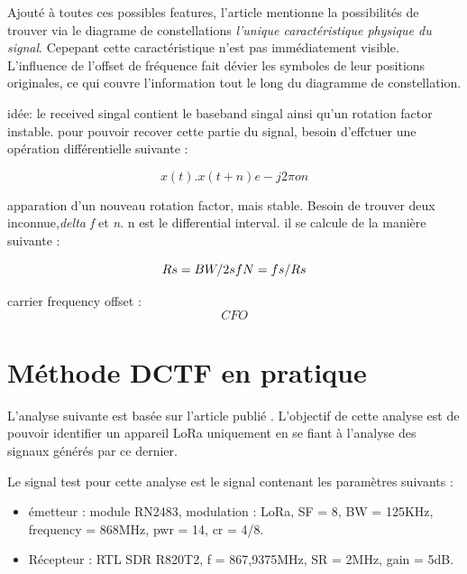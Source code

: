 Ajouté à toutes ces possibles features, l'article mentionne la possibilités de trouver via le diagrame de constellations \textit{l'unique caractéristique physique du signal}. Cepepant cette caractéristique n'est pas immédiatement visible. L'influence de l'offset de fréquence fait dévier les symboles de leur positions originales, ce qui couvre l'information tout le long du diagramme de constellation.


idée: le received singal contient le baseband singal ainsi qu'un rotation factor instable. pour pouvoir recover cette partie du signal, besoin d'effctuer une opération différentielle suivante :

\begin{equation}\label{eq1}
	x(t) . x(t+n) e -j2\pi on
\end{equation} 

apparation d'un nouveau rotation factor, mais stable. Besoin de trouver deux inconnue,\textit{delta f} et \textit{n}. n est le differential interval. il se calcule de la manière suivante :

\begin{equation}\label{eq2}
 Rs = BW / 2sf \\
 N = fs / Rs
\end{equation}

carrier frequency offset :
\begin{equation}\label{eq3}
 CFO
\end{equation}

\section{Méthode DCTF en pratique}

L'analyse suivante est basée sur l'article publié  \cite{loraDCTF}. L'objectif de cette analyse est de pouvoir identifier un appareil LoRa uniquement en se fiant à l'analyse des signaux générés par ce dernier. 

Le signal test pour cette analyse est le signal contenant les paramètres suivants :

\vspace{0.1cm}

\begin{itemize}
\item émetteur : module RN2483, modulation : LoRa, SF = 8, BW = 125KHz, frequency = 868MHz, pwr = 14, cr = 4/8.
\item Récepteur : RTL SDR R820T2, f = 867,9375MHz, SR = 2MHz, gain = 5dB.
\end{itemize}

